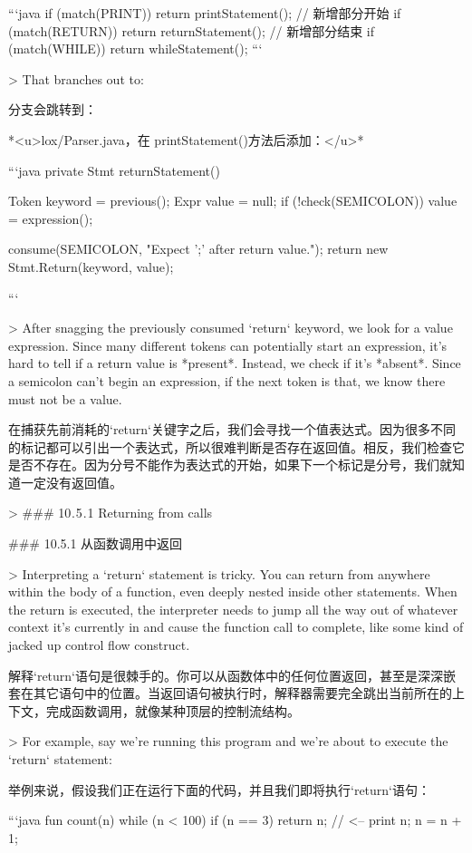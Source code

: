 \documentclass[cn,11pt,chinese]{elegantbook}
\begin{document}
{{{{{{{{```java
    if (match(PRINT)) return printStatement();
    // 新增部分开始
    if (match(RETURN)) return returnStatement();
    // 新增部分结束
    if (match(WHILE)) return whileStatement();
```

> That branches out to:

分支会跳转到：

*<u>lox/Parser.java，在 printStatement()方法后添加：</u>*

```java
  private Stmt returnStatement() {
    Token keyword = previous();
    Expr value = null;
    if (!check(SEMICOLON)) {
      value = expression();
    }

    consume(SEMICOLON, "Expect ';' after return value.");
    return new Stmt.Return(keyword, value);
  }
```

> After snagging the previously consumed `return` keyword, we look for a value expression. Since many different tokens can potentially start an expression, it’s hard to tell if a return value is *present*. Instead, we check if it’s *absent*. Since a semicolon can’t begin an expression, if the next token is that, we know there must not be a value.

在捕获先前消耗的`return`关键字之后，我们会寻找一个值表达式。因为很多不同的标记都可以引出一个表达式，所以很难判断是否存在返回值。相反，我们检查它是否不存在。因为分号不能作为表达式的开始，如果下一个标记是分号，我们就知道一定没有返回值。

> ### 10 . 5 . 1 Returning from calls

### 10.5.1 从函数调用中返回

> Interpreting a `return` statement is tricky. You can return from anywhere within the body of a function, even deeply nested inside other statements. When the return is executed, the interpreter needs to jump all the way out of whatever context it’s currently in and cause the function call to complete, like some kind of jacked up control flow construct.

解释`return`语句是很棘手的。你可以从函数体中的任何位置返回，甚至是深深嵌套在其它语句中的位置。当返回语句被执行时，解释器需要完全跳出当前所在的上下文，完成函数调用，就像某种顶层的控制流结构。

> For example, say we’re running this program and we’re about to execute the `return` statement:

举例来说，假设我们正在运行下面的代码，并且我们即将执行`return`语句：

```java
fun count(n) {
  while (n < 100) {
    if (n == 3) return n; // <--
    print n;
    n = n + 1;
  }
}

}}}}}}}}
\end{document}

